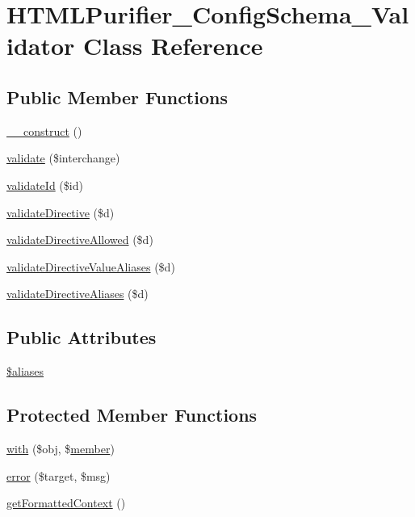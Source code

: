 \hypertarget{classHTMLPurifier__ConfigSchema__Validator}{\section{H\+T\+M\+L\+Purifier\+\_\+\+Config\+Schema\+\_\+\+Validator Class Reference}
\label{classHTMLPurifier__ConfigSchema__Validator}
}
\subsection*{Public Member Functions}
\begin{DoxyCompactItemize}
\item 
\hyperlink{classHTMLPurifier__ConfigSchema__Validator_a7b5ac06bd7462c5476daf6b82847d7bd}{\+\_\+\+\_\+construct} ()
\item 
\hyperlink{classHTMLPurifier__ConfigSchema__Validator_a162e82d2769eee3772d691a09493534c}{validate} (\$interchange)
\item 
\hyperlink{classHTMLPurifier__ConfigSchema__Validator_a97499d6e2058add5e05dff8e07c5a86b}{validate\+Id} (\$id)
\item 
\hyperlink{classHTMLPurifier__ConfigSchema__Validator_ac034d0cfdbf458394a152585d4ee016d}{validate\+Directive} (\$d)
\item 
\hyperlink{classHTMLPurifier__ConfigSchema__Validator_a55e873b0555d61ad85dc0d269d785c2b}{validate\+Directive\+Allowed} (\$d)
\item 
\hyperlink{classHTMLPurifier__ConfigSchema__Validator_a54c46f2ca559c5d40665602a8533f247}{validate\+Directive\+Value\+Aliases} (\$d)
\item 
\hyperlink{classHTMLPurifier__ConfigSchema__Validator_a6030b31bbe3b7581b0c556b7ff894a34}{validate\+Directive\+Aliases} (\$d)
\end{DoxyCompactItemize}
\subsection*{Public Attributes}
\begin{DoxyCompactItemize}
\item 
\hyperlink{classHTMLPurifier__ConfigSchema__Validator_aad5127ca1ef16cfb7cd636f3c3a2f1a6}{\$aliases}
\end{DoxyCompactItemize}
\subsection*{Protected Member Functions}
\begin{DoxyCompactItemize}
\item 
\hyperlink{classHTMLPurifier__ConfigSchema__Validator_a2a65d00220042f70add18d0f5b44a36d}{with} (\$obj, \$\hyperlink{classmember}{member})
\item 
\hyperlink{classHTMLPurifier__ConfigSchema__Validator_ac86e12e8c05e854b84c8d0472d111e2c}{error} (\$target, \$msg)
\item 
\hyperlink{classHTMLPurifier__ConfigSchema__Validator_ad5b7b7b06a6cc262215bd2da1b10dee4}{get\+Formatted\+Context} ()
\end{DoxyCompactItemize}
